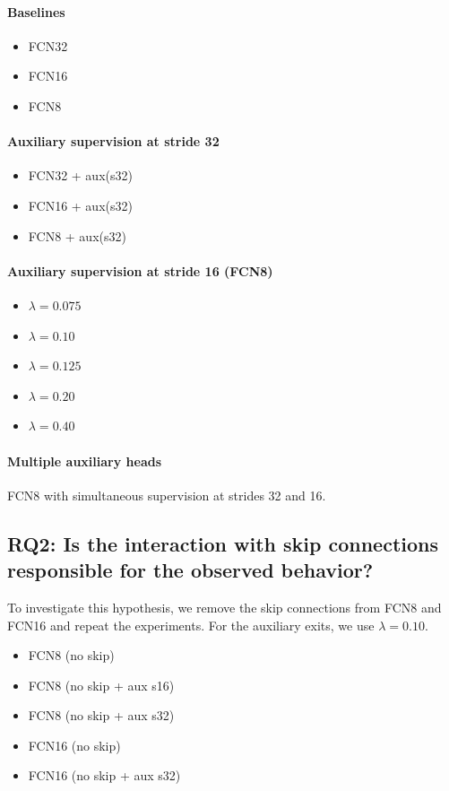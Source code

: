 \documentclass{article}
\begin{document}
    \paragraph{Baselines}
    \begin{itemize}
        \item FCN32
        \item FCN16
        \item FCN8
    \end{itemize}

    \paragraph{Auxiliary supervision at stride 32}
    \begin{itemize}
        \item FCN32 + aux(s32)
        \item FCN16 + aux(s32)
        \item FCN8 + aux(s32)
    \end{itemize}

    \paragraph{Auxiliary supervision at stride 16 (FCN8)}
    \begin{itemize}
        \item $\lambda=0.075$
        \item $\lambda=0.10$
        \item $\lambda=0.125$
        \item $\lambda=0.20$
        \item $\lambda=0.40$
    \end{itemize}

    \paragraph{Multiple auxiliary heads} \hfill\newline
    FCN8 with simultaneous supervision at strides 32 and 16.

    \subsection{RQ2: Is the interaction with skip connections responsible for the observed behavior?}

    To investigate this hypothesis, we remove the skip connections from FCN8 and FCN16
    and repeat the experiments. For the auxiliary exits, we use $\lambda=0.10$.
    \begin{itemize}
        \item FCN8 (no skip)
        \item FCN8 (no skip + aux s16)
        \item FCN8 (no skip + aux s32)
        \item FCN16 (no skip)
        \item FCN16 (no skip + aux s32)
    \end{itemize}
\end{document}
